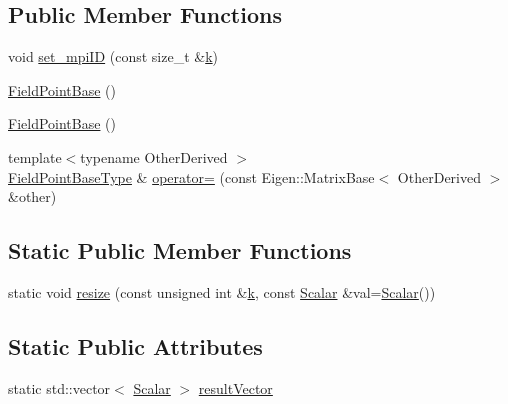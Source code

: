 \subsection*{Public Member Functions}
\begin{DoxyCompactItemize}
\item 
void \hyperlink{structmodel_1_1_field_point_base_a2a7702172dfc6e9a9db334bc651999dd}{set\+\_\+mpi\+I\+D} (const size\+\_\+t \&\hyperlink{_f_e_m_2linear__elasticity__3d_2tetgen_2generate_p_o_l_ycube_8m_a5d2aad4440da75aa43f2643e72b1a3bd}{k})
\item 
\hyperlink{structmodel_1_1_field_point_base_af55c8605e9c4daf15deeb9ec9f65391b}{Field\+Point\+Base} ()
\item 
\hyperlink{structmodel_1_1_field_point_base_af55c8605e9c4daf15deeb9ec9f65391b}{Field\+Point\+Base} ()
\item 
{\footnotesize template$<$typename Other\+Derived $>$ }\\\hyperlink{structmodel_1_1_field_point_base_af0913f98b672e5e02c75754aed6e0355}{Field\+Point\+Base\+Type} \& \hyperlink{structmodel_1_1_field_point_base_a3321b533154eee131ae928595961a718}{operator=} (const Eigen\+::\+Matrix\+Base$<$ Other\+Derived $>$ \&other)
\end{DoxyCompactItemize}
\subsection*{Static Public Member Functions}
\begin{DoxyCompactItemize}
\item 
static void \hyperlink{structmodel_1_1_field_point_base_ad4c64a38c3fc2f2af3d456ee3a0cc61c}{resize} (const unsigned int \&\hyperlink{_f_e_m_2linear__elasticity__3d_2tetgen_2generate_p_o_l_ycube_8m_a5d2aad4440da75aa43f2643e72b1a3bd}{k}, const \hyperlink{structmodel_1_1_field_point_base_a3dda233ae4c7db5b714a8a3f25486dde}{Scalar} \&val=\hyperlink{structmodel_1_1_field_point_base_a3dda233ae4c7db5b714a8a3f25486dde}{Scalar}())
\end{DoxyCompactItemize}
\subsection*{Static Public Attributes}
\begin{DoxyCompactItemize}
\item 
static std\+::vector$<$ \hyperlink{structmodel_1_1_field_point_base_a3dda233ae4c7db5b714a8a3f25486dde}{Scalar} $>$ \hyperlink{structmodel_1_1_field_point_base_a4e28d7aa8e628b4b0bd6a58cd422ea78}{result\+Vector}
\end{DoxyCompactItemize}


